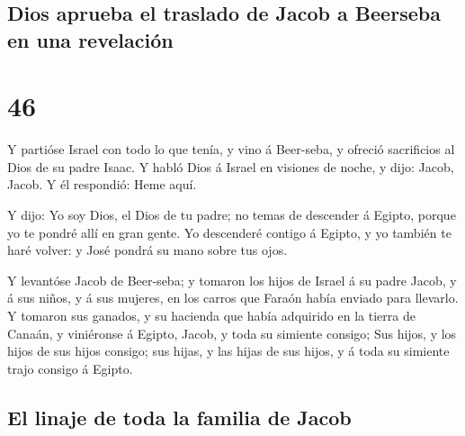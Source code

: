\hypertarget{dios-aprueba-el-traslado-de-jacob-a-beerseba-en-una-revelaciuxf3n}{%
\subsection{Dios aprueba el traslado de Jacob a Beerseba en una
revelación}\label{dios-aprueba-el-traslado-de-jacob-a-beerseba-en-una-revelaciuxf3n}}

\hypertarget{section-45}{%
\section{46}\label{section-45}}

 Y partióse Israel con todo lo que tenía, y vino á
Beer-seba, y ofreció sacrificios al Dios de su padre Isaac. 
Y habló Dios á Israel en visiones de noche, y dijo: Jacob, Jacob. Y él
respondió: Heme aquí.

 Y dijo: Yo soy Dios, el Dios de tu padre; no temas de
descender á Egipto, porque yo te pondré allí en gran gente. 
Yo descenderé contigo á Egipto, y yo también te haré volver: y José
pondrá su mano sobre tus ojos.

 Y levantóse Jacob de Beer-seba; y tomaron los hijos de
Israel á su padre Jacob, y á sus niños, y á sus mujeres, en los carros
que Faraón había enviado para llevarlo.  Y tomaron sus
ganados, y su hacienda que había adquirido en la tierra de Canaán, y
viniéronse á Egipto, Jacob, y toda su simiente consigo;  Sus
hijos, y los hijos de sus hijos consigo; sus hijas, y las hijas de sus
hijos, y á toda su simiente trajo consigo á Egipto.

\hypertarget{el-linaje-de-toda-la-familia-de-jacob}{%
\subsection{El linaje de toda la familia de
Jacob}\label{el-linaje-de-toda-la-familia-de-jacob}}

